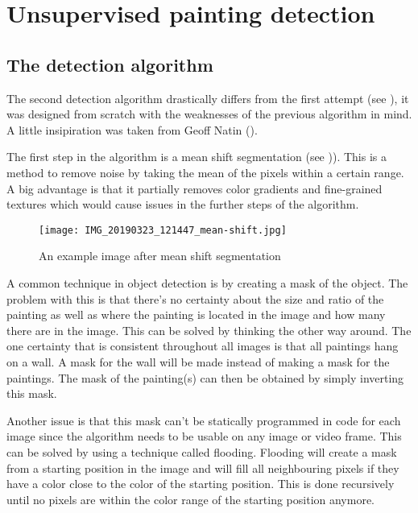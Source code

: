\section{Unsupervised painting detection}
\label{sec:unsupervised_painting_detection}

\subsection{The detection algorithm}
\label{subsec:detection-algo}

The second detection algorithm drastically differs from the first attempt (see ), it was designed from scratch with the weaknesses of the previous algorithm in mind. A little insipiration was taken from Geoff Natin (\cite{natin2020}).

The first step in the algorithm is a mean shift segmentation (see )). This is a method to remove noise by taking the mean of the pixels within a certain range. A big advantage is that it partially removes color gradients and fine-grained textures which would cause issues in the further steps of the algorithm.

\begin{figure}[h]
    \texttt{[image: IMG\_20190323\_121447\_mean-shift.jpg]}
    \centering
    \caption{An example image after mean shift segmentation}
    \label{fig:paiting_detection_mean_shift}
\end{figure}

A common technique in object detection is by creating a mask of the object. The problem with this is that there's no certainty about the size and ratio of the painting as well as where the painting is located in the image and how many there are in the image. This can be solved by thinking the other way around. The one certainty that is consistent throughout all images is that all paintings hang on a wall. A mask for the wall will be made instead of making a mask for the paintings. The mask of the painting(s) can then be obtained by simply inverting this mask.

Another issue is that this mask can't be statically programmed in code for each image since the algorithm needs to be usable on any image or video frame. This can be solved by using a technique called flooding. Flooding will create a mask from a starting position in the image and will fill all neighbouring pixels if they have a color close to the color of the starting position. This is done recursively until no pixels are within the color range of the starting position anymore. \cite{he2019scan}

